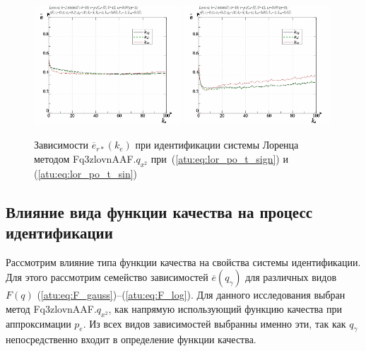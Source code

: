 \begin{figure}[ht!]
  \centerline{
    \includegraphics[width=0.49\textwidth]{p/cha/lor/Fq3zlovnAAF/lor_Fq3zlovnAAF_qx2-p_ke_e_sign.png}
    \hfill
    \includegraphics[width=0.49\textwidth]{p/cha/lor/Fq3zlovnAAF/lor_Fq3zlovnAAF_qx2-p_ke_e_sin.png}
  }
  \caption{Зависимости $\overline{e}_{r*}(k_e)$ при идентификации системы Лоренца методом Fq3zlovnAAF.$q_{x^2}$
   при~(\ref{atu:eq:lor_po_t_sign}) и (\ref{atu:eq:lor_po_t_sin})}
  \label{atu:f:lor_ke_Fq3zlovnAAF.q_x2}
\end{figure}




\subsection{Влияние вида функции качества на процесс идентификации}  %

Рассмотрим влияние типа функции качества на свойства системы идентификации.
Для этого рассмотрим семейство зависимостей
$\overline{e}(q_\gamma)$ для различных видов $F(q)$
(\ref{atu:eq:F_gauss})--(\ref{atu:eq:F_log}).
Для данного исследования выбран метод Fq3zlovnAAF.$q_{x^2}$,
как напрямую использующий функцию качества при
аппроксимации $p_e$.
Из всех видов зависимостей выбранны именно эти,
так как $q_\gamma$ непосредственно входит в определение функции качества.


